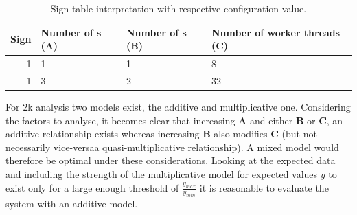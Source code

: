     \begin{table}
        \small{
            \begin{tabular}{r l l l }
                \toprule
                Sign & Number of \srv{}s (\textbf{A}) & Number of \mw{}s (\textbf{B}) & Number of worker threads (\textbf{C})   \\
                \midrule
                -1  & 1                            & 1                           & 8   \\
                1   & 3                            & 2                           & 32  \\
                \bottomrule
            \end{tabular}
            \caption{Sign table interpretation with respective configuration value.\label{tab:6_2k-factors}}
        }
    \end{table}

    For 2k analysis two models exist, the additive and multiplicative one. Considering the factors to analyse, it
    becomes clear that increasing \textbf{A} and either \textbf{B} or \textbf{C}, an additive relationship exists
    whereas increasing \textbf{B} also modifies \textbf{C} (but not necessarily vice-versa\textemdash a
    quasi-multiplicative relationship). A mixed model would therefore be optimal under these considerations. Looking at
    the expected data and including the strength of the multiplicative model for expected values $y$ to exist only for
    a large enough threshold of $\tfrac{y_{max}}{y_{min}}$ it is reasonable to evaluate the system with an additive
    model.

